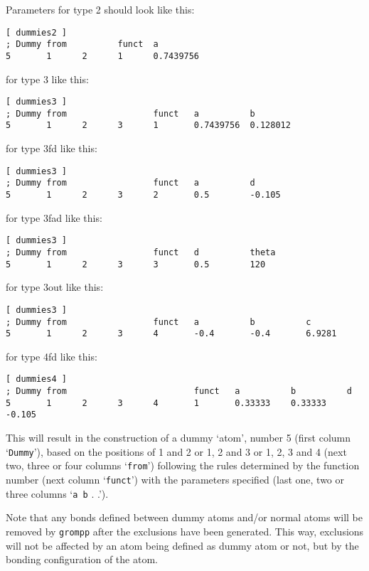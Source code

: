 Parameters for type 2 should look like this:
{\small\begin{verbatim}
[ dummies2 ] 
; Dummy from          funct  a 
5       1      2      1      0.7439756
\end{verbatim}}

for type 3 like this:
{\small\begin{verbatim}
[ dummies3 ]
; Dummy from                 funct   a          b
5       1      2      3      1       0.7439756  0.128012
\end{verbatim}}

for type 3fd like this:
{\small\begin{verbatim}
[ dummies3 ]
; Dummy from                 funct   a          d
5       1      2      3      2       0.5        -0.105
\end{verbatim}}

for type 3fad like this:
{\small\begin{verbatim}
[ dummies3 ]
; Dummy from                 funct   d          theta
5       1      2      3      3       0.5        120
\end{verbatim}}

for type 3out like this:
{\small\begin{verbatim}
[ dummies3 ]
; Dummy from                 funct   a          b          c
5       1      2      3      4       -0.4       -0.4       6.9281
\end{verbatim}}

for type 4fd like this:
{\small\begin{verbatim}
[ dummies4 ]
; Dummy from                         funct   a          b          d
5       1      2      3      4       1       0.33333    0.33333    -0.105
\end{verbatim}}

This will result in the construction of a dummy `atom', number 5
(first column `\verb'Dummy''), based on the positions of 1 and 2 or 1,
2 and 3 or 1, 2, 3 and 4 (next two, three or four columns
`\verb'from'') following the rules determined by the function number
(next column `\verb'funct'') with the parameters specified (last one,
two or three columns `\verb'a b' . .').

Note that any bonds defined between dummy atoms and/or normal atoms
will be removed by {\tt grompp} after the exclusions have been
generated. This way, exclusions will not be affected by an atom being
defined as dummy atom or not, but by the bonding configuration of the
atom.

